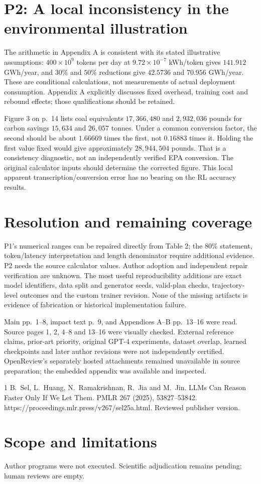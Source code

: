 \documentclass[10pt]{article}
\begin{document}
\section*{P2: A local inconsistency in the environmental illustration}
The arithmetic in Appendix A is consistent with its stated illustrative assumptions: \(400\times10^9\) tokens per day at \(9.72\times10^{-7}\) kWh/token gives \(141.912\) GWh/year, and \(30\%\) and \(50\%\) reductions give \(42.5736\) and \(70.956\) GWh/year. These are conditional calculations, not measurements of actual deployment consumption. Appendix A explicitly discusses fixed overhead, training cost and rebound effects; those qualifications should be retained.\par
Figure 3 on p. 14 lists coal equivalents \(17{,}366{,}480\) and \(2{,}932{,}036\) pounds for carbon savings \(15{,}634\) and \(26{,}057\) tonnes. Under a common conversion factor, the second should be about \(1.66669\) times the first, not \(0.16883\) times it. Holding the first value fixed would give approximately \(28{,}944{,}504\) pounds. That is a consistency diagnostic, not an independently verified EPA conversion. The original calculator inputs should determine the corrected figure. This local apparent transcription/conversion error has no bearing on the RL accuracy results.\par
\section*{Resolution and remaining coverage}
P1’s numerical ranges can be repaired directly from Table 2; the \(80\%\) statement, token/latency interpretation and length denominator require additional evidence. P2 needs the source calculator values. Author adoption and independent repair verification are unknown. The most useful reproducibility additions are exact model identifiers, data split and generator seeds, valid-plan checks, trajectory-level outcomes and the custom trainer revision. None of the missing artifacts is evidence of fabrication or historical implementation failure.\par
Main pp. 1–8, impact text p. 9, and Appendices A–B pp. 13–16 were read. Source pages 1, 2, 4–8 and 13–16 were visually checked. External reference claims, prior-art priority, original GPT-4 experiments, dataset overlap, learned checkpoints and later author revisions were not independently certified. OpenReview’s separately hosted attachments remained unavailable in source preparation; the embedded appendix was available and inspected.\par
1 B. Sel, L. Huang, N. Ramakrishnan, R. Jia and M. Jin. LLMs Can Reason Faster Only If We Let Them. PMLR 267 (2025), 53827–53842. https://proceedings.mlr.press/v267/sel25a.html. Reviewed publisher version.\par
\section*{Scope and limitations}
Author programs were not executed. Scientific adjudication remains pending; human reviews are empty.\par
\end{document}
